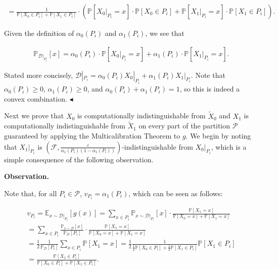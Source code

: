 \[\begin{gathered}
=\frac{1}{\mathbb{P}[X_{0}\in P_{i}]+\mathbb{P}[X_{1}\in P_{i}]}\cdot\left(\mathbb{P}[X_{0}|_{P_{i}}=x]\cdot\mathbb{P}[X_{0}\in P_{i}]+\mathbb{P}[X_{1}|_{P_{i}}=x]\cdot\mathbb{P}[X_{1}\in P_{i}]\right).
\end{gathered}\]


Given the definition of $\alpha_{0}(P_{i})$ and $\alpha_{1}(P_{i})$, we see that\par


\[\begin{gathered}
\mathbb{P}_{\mathcal{D}|_{P_{i}}}[x]=\alpha_{0}(P_{i})\cdot\mathbb{P}[X_{0}|_{P_{i}}=x]+\alpha_{1}(P_{i})\cdot\mathbb{P}[X_{1}|_{P_{i}}=x].
\end{gathered}\]


Stated more concisely, $\mathcal{D}|_{P_{i}}=\alpha_{0}(P_{i})X_{0}|_{P_{i}}+\alpha_{1}(P_{i})X_{1}|_{P_{i}}$. Note that $\alpha_{0}(P_{i})\geq 0$, $\alpha_{1}(P_{i})\geq 0$, and $\alpha_{0}(P_{i})+\alpha_{1}(P_{i})=1$, so this is indeed a convex combination.
$\blacktriangleleft$\par




Next we prove that $X_{0}$ is computationally indistinguishable from $\widetilde{X}_{0}$ and $X_{1}$ is computationally indistinguishable from $\widetilde{X}_{1}$ on every part of the partition $\mathcal{P}$ guaranteed by applying the Multicalibration Theorem to $g$. We begin by noting that $X_{1}|_{P_{i}}$ is $(\mathcal{F},\frac{\varepsilon}{\alpha_{1}(P_{i})(1-\alpha_{1}(P_{i}))})$-indistinguishable from $X_{0}|_{P_{i}}$, which is a simple consequence of the following observation.\par





\par\medskip\noindent\textbf{Observation.}\par




Note that, for all $P_{i}\in\mathcal{P}$, $v_{P_{i}}=\alpha_{1}(P_{i})$, which can be seen as follows:\par


\[\begin{gathered}
\displaystyle v_{P_{i}} \displaystyle=\mathbb{E}_{x\sim\mathcal{D}|_{P_{i}}}[g(x)]=\sum_{x\in P_{i}}\mathbb{P}_{x\sim\mathcal{D}|_{P_{i}}}[x]\cdot\frac{\mathbb{P}[X_{1}=x]}{\mathbb{P}[X_{0}=x]+\mathbb{P}[X_{1}=x]} \\
\displaystyle=\sum_{x\in P_{i}}\frac{\mathbb{P}_{x\sim\mathcal{D}}[x]}{\mathbb{P}_{\mathcal{D}}[P_{i}]}\cdot\frac{\mathbb{P}[X_{1}=x]}{\mathbb{P}[X_{0}=x]+\mathbb{P}[X_{1}=x]} \\
\displaystyle=\frac{1}{2}\frac{1}{\mathbb{P}_{\mathcal{D}}[P_{i}]}\sum_{x\in P_{i}}\mathbb{P}[X_{1}=x]=\frac{1}{2}\frac{1}{\frac{1}{2}\mathbb{P}[X_{0}\in P_{i}]+\frac{1}{2}\mathbb{P}[X_{1}\in P_{i}]}\mathbb{P}[X_{1}\in P_{i}] \\
\displaystyle=\frac{\mathbb{P}[X_{1}\in P_{i}]}{\mathbb{P}[X_{0}\in P_{i}]+\mathbb{P}[X_{1}\in P_{i}]}.
\end{gathered}\]



